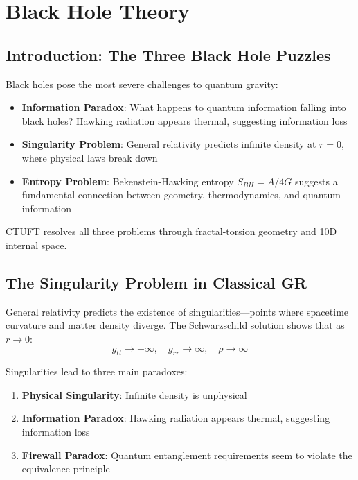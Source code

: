 \section{Black Hole Theory}
\label{sec:bh}

\subsection{Introduction: The Three Black Hole Puzzles}

Black holes pose the most severe challenges to quantum gravity:
\begin{itemize}
    \item \textbf{Information Paradox}: What happens to quantum information falling into black holes? Hawking radiation appears thermal, suggesting information loss
    \item \textbf{Singularity Problem}: General relativity predicts infinite density at $r = 0$, where physical laws break down
    \item \textbf{Entropy Problem}: Bekenstein-Hawking entropy $S_{BH} = A/4G$ suggests a fundamental connection between geometry, thermodynamics, and quantum information
\end{itemize}

CTUFT resolves all three problems through fractal-torsion geometry and 10D internal space.

\subsection{The Singularity Problem in Classical GR}

General relativity predicts the existence of singularities—points where spacetime curvature and matter density diverge. The Schwarzschild solution shows that as $r \to 0$:
\begin{equation}
    g_{tt} \to -\infty, \quad g_{rr} \to \infty, \quad \rho \to \infty
\end{equation}

Singularities lead to three main paradoxes:
\begin{enumerate}
    \item \textbf{Physical Singularity}: Infinite density is unphysical
    \item \textbf{Information Paradox}: Hawking radiation appears thermal, suggesting information loss
    \item \textbf{Firewall Paradox}: Quantum entanglement requirements seem to violate the equivalence principle
\end{enumerate}

